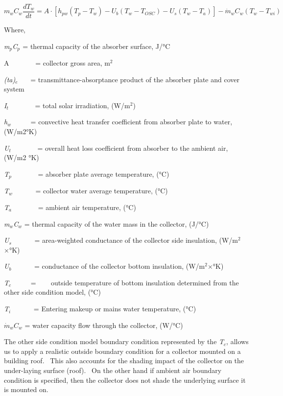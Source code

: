 \begin{equation}
{m_w}{C_w}\frac{{d{T_w}}}{{dt}} = A \cdot \left[ {{h_{pw}}\left( {{T_p} - {T_w}} \right) - {U_b}\left( {{T_w} - {T_{OSC}}} \right) - {U_s}\left( {{T_w} - {T_a}} \right)} \right] - {\dot m_w}{C_w}\left( {{T_w} - {T_{wi}}} \right)
\end{equation}

Where,

\emph{m\(_{p}\)C\(_{p}\)}\(_{ }\) = thermal capacity of the absorber surface, J/°C

A~~~~~~~ = collector gross area, m\(^{2}\)

\emph{(ta)}\(_{e}\)~~~ = transmittance-absorptance product of the absorber plate and cover system

\emph{I\(_{t}\)}~~~~~~~ = total solar irradiation, (W/m\(^{2}\))

\emph{h\(_{w}\)}~~~~~ = convective heat transfer coefficient from absorber plate to water, (W/m2°K)

\emph{U\(_{t}\)}~~~~~~~ = overall heat loss coefficient from absorber to the ambient air, (W/m2 °K)

\emph{T\(_{p}\)}~~~~~~~ = absorber plate average temperature, (°C)

\emph{T\(_{w}\)}~~~~~~ = collector water average temperature, (°C)

\emph{T\(_{a}\)}~~~~~~~ = ambient air temperature, (°C)

\emph{m\(_{w}\)C\(_{w}\)} = thermal capacity of the water mass in the collector, (J/°C)

\emph{U\(_{s}\)}~~~~~~ = area-weighted conductance of the collector side insulation, (W/m\(^{2}\)×°K)

\emph{U\(_{b}\)}~~~~~~ = conductance of the collector bottom insulation, (W/m\(^{2}\)×°K)

\emph{T\(_{c}\)}~~~~~ = ~~~ outside temperature of bottom insulation determined from the other side condition model, (°C)

\emph{T\(_{i}\)}~~~~~~ = Entering makeup or mains water temperature, (°C)

\({\dot m_w}{C_w}\) = water capacity flow through the collector, (W/°C)

The other side condition model boundary condition represented by the \emph{T\(_{c}\)}, allows us to apply a realistic outside boundary condition for a collector mounted on a building roof.~ This also accounts for the shading impact of the collector on the under-laying surface (roof).~ On the other hand if ambient air boundary condition is specified, then the collector does not shade the underlying surface it is mounted on.

